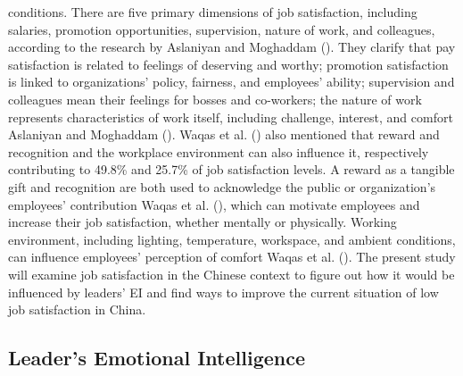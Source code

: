 \documentclass[
  man,
  longtable,
  nolmodern,
  notxfonts,
  notimes,
  colorlinks=true,linkcolor=blue,citecolor=blue,urlcolor=blue]{apa7}
\begin{document}
conditions. There are five primary dimensions of job satisfaction,
including salaries, promotion opportunities, supervision, nature of
work, and colleagues, according to the research by Aslaniyan and
Moghaddam (). They clarify that pay
satisfaction is related to feelings of deserving and worthy; promotion
satisfaction is linked to organizations' policy, fairness, and
employees' ability; supervision and colleagues mean their feelings for
bosses and co-workers; the nature of work represents characteristics of
work itself, including challenge, interest, and comfort Aslaniyan and
Moghaddam (). Waqas et al.
() also mentioned that reward and
recognition and the workplace environment can also influence it,
respectively contributing to 49.8\% and 25.7\% of job satisfaction
levels. A reward as a tangible gift and recognition are both used to
acknowledge the public or organization's employees' contribution Waqas
et al. (), which can motivate employees
and increase their job satisfaction, whether mentally or physically.
Working environment, including lighting, temperature, workspace, and
ambient conditions, can influence employees' perception of comfort Waqas
et al. (). The present study will examine
job satisfaction in the Chinese context to figure out how it would be
influenced by leaders' EI and find ways to improve the current situation
of low job satisfaction in China.

\subsection{Leader's Emotional
Intelligence}\label{leaders-emotional-intelligence}
\end{document}
